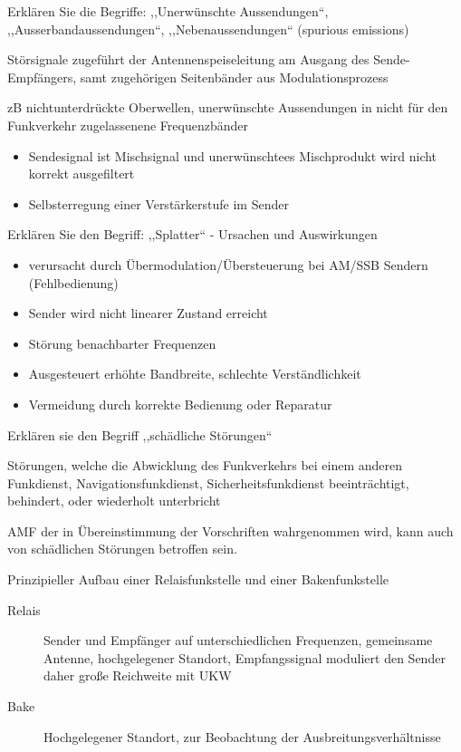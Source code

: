 \documentclass[avery5371,grid,frame,a4paper]{flashcards}
\newcommand{\card}[3]{
  \begin{flashcard}[{\chap} -- #1]{#2}#3\end{flashcard}
}
\begin{document}
\card{94}{Erklären Sie die Begriffe: ,,Unerwünschte Aussendungen``, ,,Ausserbandaussendungen``, ,,Nebenaussendungen`` (spurious emissions)}{
  \small
  \begin{description}\itemsep0pt
    \item[Unerwünschte Aussendung]
      Störsignale zugeführt der Antennenspeiseleitung am Ausgang des Sende-Empfängers,
      samt zugehörigen Seitenbänder aus Modulationsprozess
    \item[Ausserbandaussendungen]
      zB nichtunterdrückte Oberwellen, unerwünschte Aussendungen in nicht für den Funkverkehr zugelassenene Frequenzbänder
    \item[Nebenaussendungen]
      \begin{itemize}\itemsep0pt
        \item Sendesignal ist Mischsignal und unerwünschtees Mischprodukt wird nicht korrekt ausgefiltert
        \item Selbsterregung einer Verstärkerstufe im Sender
      \end{itemize}
  \end{description}
}
\card{95}{Erklären Sie den Begriff: ,,Splatter`` - Ursachen und Auswirkungen}{
  \begin{itemize}\itemsep0pt
    \item verursacht durch Übermodulation/Übersteuerung bei AM/SSB Sendern (Fehlbedienung)
    \item Sender wird nicht linearer Zustand erreicht
    \item Störung benachbarter Frequenzen
    \item Ausgesteuert erhöhte Bandbreite, schlechte Verständlichkeit
    \item Vermeidung durch korrekte Bedienung oder Reparatur
  \end{itemize}
}
\card{96}{Erklären sie den Begriff ,,schädliche Störungen``}{
  \item
  Störungen, welche die Abwicklung des Funkverkehrs bei einem anderen Funkdienst, Navigationsfunkdienst,
Sicherheitsfunkdienst beeinträchtigt, behindert, oder wiederholt unterbricht

  \item
  AMF der in Übereinstimmung der Vorschriften wahrgenommen wird, kann auch von schädlichen Störungen betroffen sein.
}
\card{97}{Prinzipieller Aufbau einer Relaisfunkstelle und einer Bakenfunkstelle}{
  \begin{description}
    \item[Relais] Sender und Empfänger auf unterschiedlichen Frequenzen, gemeinsame Antenne, hochgelegener Standort, Empfangssignal moduliert den Sender daher große Reichweite mit UKW
    \item[Bake] Hochgelegener Standort, zur Beobachtung der Ausbreitungsverhältnisse
  \end{description}
}
\end{document}
